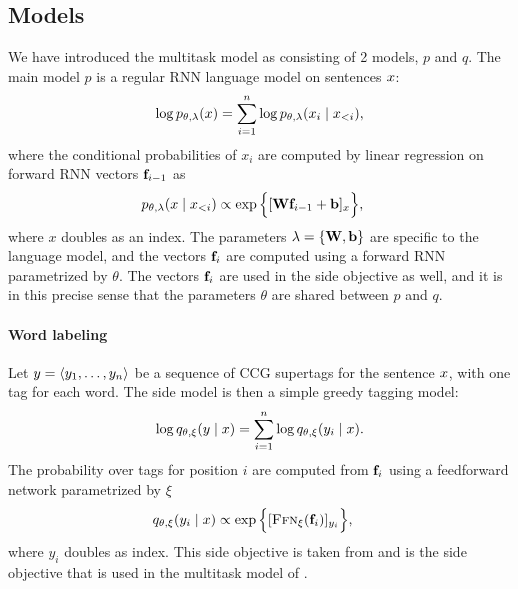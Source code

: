   \subsection{Models}
    We have introduced the multitask model as consisting of 2 models, $p$ and $q$. The main model $p$ is a regular RNN language model on sentences $x$:
    \begin{align*}
      \log p_{\theta, \lambda}(x) = \sum_{i=1}^n \log p_{\theta, \lambda}(x_i \mid x_{<i}),
    \end{align*}
    where the conditional probabilities of $x_i$ are computed by linear regression on forward RNN vectors $\mathbf{f}_{i-1}$ as
    \begin{align*}
      p_{\theta, \lambda}( x \mid x_{<i}) &\propto \exp \Big \{ [ \mathbf{W} \mathbf{f}_{i-1} + \mathbf{b} ]_{x} \Big\},
    \end{align*}
    where $x$ doubles as an index. The parameters $\lambda = \{ \mathbf{W}, \mathbf{b} \}$ are specific to the language model, and the vectors $\mathbf{f}_i$ are computed using a forward RNN parametrized by $\theta$. The vectors $\mathbf{f}_i$ are used in the side objective as well, and it is in this precise sense that the parameters $\theta$ are shared between $p$ and $q$.

    \paragraph{Word labeling}
      Let $y = \langle y_1, \dots, y_n \rangle$ be a sequence of CCG supertags for the sentence $x$, with one tag for each word. The side model is then a simple greedy tagging model:
      \begin{align*}
        \log q_{\theta, \xi}(y \mid x)
          &= \sum_{i=1}^n \log q_{\theta, \xi}( y_i \mid x).  \\
      \end{align*}
      The probability over tags for position $i$ are computed from $\mathbf{f}_i$ using a feedforward network parametrized by $\xi$
      \begin{align*}
        q_{\theta, \xi}( y_i \mid x) &\propto \exp \Big \{ [ \textsc{Ffn}_{\xi}( \mathbf{f}_{i} ) ]_{y_i} \Big\},
      \end{align*}
      where $y_i$ doubles as index. This side objective is taken from \citet{enguehard2017multitask} and is the side objective that is used in the multitask model of \citet{linzen2018targeted}.

